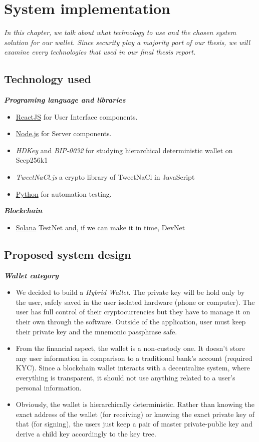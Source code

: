 \chapter{System implementation} \label{chap:System_implementation}
\textit{In this chapter, we talk about what technology to use and the chosen system solution for our wallet. Since security play a majority part of our thesis, we will examine every technologies that used in our final thesis report.}
\minitoc

\section{Technology used}
{\textit {\textbf{Programing language and libraries}}}
\begin{itemize}
\item \href{https://reactjs.org/}{ReactJS} for User Interface components. 
\item \href{https://nodejs.org/en/}{Node.js} for Server components.
\item \emph{HDKey} and \emph{BIP-0032} for studying hierarchical deterministic wallet on Secp256k1
\item \emph{TweetNaCl.js} a crypto library of TweetNaCl in JavaScript
\item \href{https://www.python.org/}{Python} for automation testing.
\end{itemize}

{\textit {\textbf{Blockchain}}}
\begin{itemize}
    \item \href{https://solana.com/}{Solana} TestNet and, if we can make it in time, DevNet
\end{itemize}

\section{Proposed system design}
{\textit {\textbf{Wallet category}}}
\begin{itemize}
    \item We decided to build a \emph{Hybrid Wallet}. The private key will be hold only by the user, safely saved in the user isolated hardware (phone or computer). The user has full control of their cryptocurrencies but they have to manage it on their own through the software. Outside of the application, user must keep their private key and the mnemonic passphrase safe.
    \item From the financial aspect, the wallet is a non-custody one. It doesn't store any user information in comparison to a traditional bank's account (required KYC). Since a blockchain wallet interacts with a decentralize system, where everything is transparent, it should not use anything related to a user's personal information.
    \item Obviously, the wallet is hierarchically deterministic. Rather than knowing the exact address of the wallet (for receiving) or knowing the exact private key of that (for signing), the users just keep a pair of master private-public key and derive a child key accordingly to the key tree.
\end{itemize}

